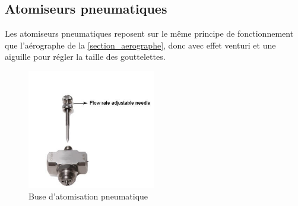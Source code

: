 \subsection{Atomiseurs pneumatiques}
Les atomiseurs pneumatiques reposent sur le même principe de fonctionnement que l'aérographe de la \autoref{section_aerographe}, donc avec effet
venturi et une aiguille pour régler la taille des gouttelettes.
\begin{figure}[H]
    \centering
    \includegraphics[width=0.5\textwidth]{assets/figures/etat_art/atomizing_nozzle.jpg}
    \caption[Buse d'atomisation pneumatique]{Buse d'atomisation pneumatique \autocite{photo_buse_atomisation}\footnotemark}
\end{figure}

